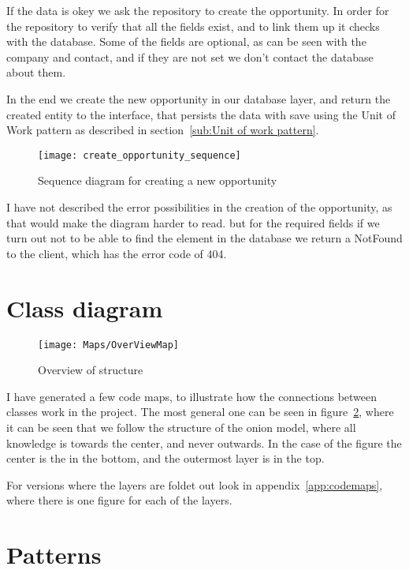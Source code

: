 If the data is okey we ask the repository to create the opportunity. In order
for the repository to verify that all the fields exist, and to link them up it
checks with the database. Some of the fields are optional, as can be seen with
the company and contact, and if they are not set we don't contact the database
about them.

In the end we create the new opportunity in our database layer, and return the
created entity to the interface, that persists the data with save using the Unit
of Work pattern as described in section~\ref{sub:Unit of work pattern}.

\begin{figure}[!htb]
  \centering
  \texttt{[image: create\_opportunity\_sequence]}
  \caption{Sequence diagram for creating a new opportunity}
  \label{fig:opportunity_sequence}
\end{figure}

I have not described the error possibilities in the creation of the opportunity,
as that would make the diagram harder to read. but for the required fields if we
turn out not to be able to find the element in the database we return a NotFound
to the client, which has the error code of 404.

\section{Class diagram}
\label{sec:class_diagram}

\begin{figure}[h]
  \centering
  \texttt{[image: Maps/OverViewMap]}
  \caption{Overview of structure}
  \label{fig:overviewMap}
\end{figure}

I have generated a few code maps, to illustrate how the connections between
classes work in the project. The most general one can be seen in
figure~\ref{fig:overviewMap}, where it can be seen that we follow the structure
of the onion model, where all knowledge is towards the center, and never
outwards. In the case of the figure the center is the in the bottom, and the
outermost layer is in the top.

For versions where the layers are foldet out look in
appendix~\ref{app:codemaps}, where there is one figure for each of the layers.

\section{Patterns}
\label{sec:Patterns}

